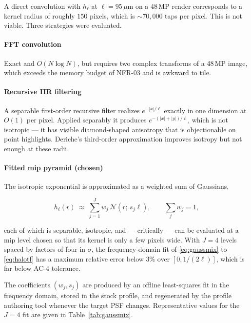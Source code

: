 A direct convolution with $h_\ell$ at $\ell = 95\,\mu$m on a 48\,MP render
corresponds to a kernel radius of roughly $150$ pixels, which is
$\sim\!70{,}000$ taps per pixel. This is not viable. Three strategies were
evaluated.

\paragraph{FFT convolution} Exact and $O(N \log N)$, but requires two complex
transforms of a 48\,MP image, which exceeds the memory budget of NFR-03 and is
awkward to tile.

\paragraph{Recursive IIR filtering} A separable first-order recursive filter
realizes $e^{-|x|/\ell}$ exactly in one dimension at $O(1)$ per pixel. Applied
separably it produces $e^{-(|x|+|y|)/\ell}$, which is not isotropic --- it has
visible diamond-shaped anisotropy that is objectionable on point highlights.
Deriche's third-order approximation \cite{deriche1993,young1995} improves
isotropy but not enough at these radii.

\paragraph{Fitted mip pyramid (chosen)} The isotropic exponential is
approximated as a weighted sum of Gaussians,

\begin{equation}
h_\ell(r) \;\approx\; \sum_{j=1}^{J} w_j\, \mathcal{N}\!\left(r;\, s_j \ell\right),
\qquad \sum_j w_j = 1,
\label{eq:gaussmix}
\end{equation}

each of which is separable, isotropic, and --- critically --- can be evaluated
at a mip level chosen so that its kernel is only a few pixels wide. With $J = 4$
levels spaced by factors of four in $\sigma$, the frequency-domain fit of
\eqref{eq:gaussmix} to \eqref{eq:halotf} has a maximum relative error below
$3\%$ over $[0, 1/(2\ell)]$, which is far below AC-4 tolerance.

The coefficients $(w_j, s_j)$ are produced by an offline least-squares fit in the
frequency domain, stored in the stock profile, and regenerated by the profile
authoring tool whenever the target PSF changes. Representative values for the
$J = 4$ fit are given in Table~\ref{tab:gaussmix}.

